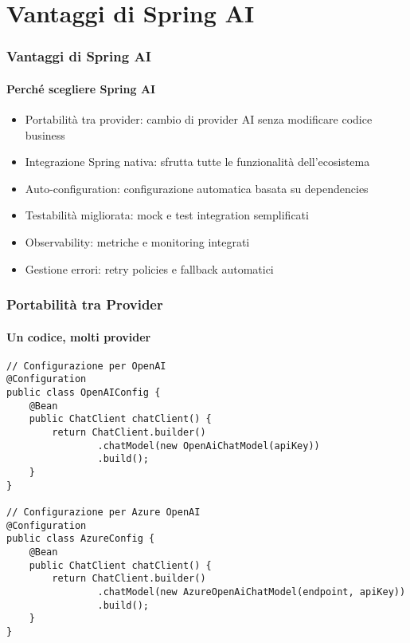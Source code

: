 \section{Vantaggi di Spring AI} %
\label{sec:spring_ai_advantages}
%
\begin{frame}[t,fragile] \frametitle{Vantaggi di Spring AI}
	{\small
		\framesubtitle{Perché scegliere Spring AI}
		\begin{itemize}[leftmargin=10pt,align=right]
			\onslide<1->\item[\alert{\faHandORight}] \alert{Portabilità tra provider:} cambio di provider AI senza modificare codice business
			\onslide<2->\item[\alert{\faHandORight}] \alert{Integrazione Spring nativa:} sfrutta tutte le funzionalità dell'ecosistema
			\onslide<3->\item[\alert{\faHandORight}] \alert{Auto-configuration:} configurazione automatica basata su dependencies
			\onslide<4->\item[\alert{\faHandORight}] \alert{Testabilità migliorata:} mock e test integration semplificati
			\onslide<5->\item[\alert{\faHandORight}] \alert{Observability:} metriche e monitoring integrati
			\onslide<6->\item[\alert{\faHandORight}] \alert{Gestione errori:} retry policies e fallback automatici
		\end{itemize}
	}
\end{frame}
%
\begin{frame}[t,fragile] \frametitle{Portabilità tra Provider}
	{\small
		\framesubtitle{Un codice, molti provider}
\begin{verbatim}
// Configurazione per OpenAI
@Configuration
public class OpenAIConfig {
    @Bean
    public ChatClient chatClient() {
        return ChatClient.builder()
                .chatModel(new OpenAiChatModel(apiKey))
                .build();
    }
}

// Configurazione per Azure OpenAI  
@Configuration
public class AzureConfig {
    @Bean  
    public ChatClient chatClient() {
        return ChatClient.builder()
                .chatModel(new AzureOpenAiChatModel(endpoint, apiKey))
                .build();
    }
}
\end{verbatim}
	}
\end{frame}
